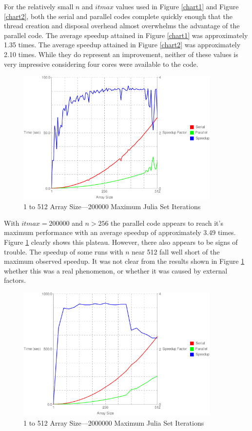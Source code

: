 \documentclass{article}
\begin{document}
For the relatively small \(n\) and \(itmax\) values used in Figure \ref{chart1} and Figure \ref{chart2}, both the serial and parallel codes complete quickly enough that the thread creation and disposal overhead almost overwhelms the advantage of the parallel code. The average speedup attained in Figure \ref{chart1} was approximately 1.35 times. The average speedup attained in Figure \ref{chart2} was approximately 2.10 times. While they do represent an improvement, neither of these values is very impressive considering four cores were available to the code.

\begin{figure}
\centering
\includegraphics[width=0.9\textwidth]{chart3nt.png}
\caption{1 to 512 Array Size---200000 Maximum Julia Set Iterations}
\label{chart3}
\end{figure}

With \(itmax = 200000\) and \(n > 256\) the parallel code appears to reach it's maximum performance with an average speedup of approximately 3.49 times. Figure \ref{chart3} clearly shows this plateau. However, there also appears to be signs of trouble. The speedup of some runs with \(n\) near 512 fall well short of the maximum observed speedup. It was not clear from the results shown in Figure \ref{chart3} whether this was a real phenomenon, or whether it was caused by external factors.

\begin{figure}
\centering
\includegraphics[width=0.9\textwidth]{chart4nt.png}
\caption{1 to 512 Array Size---2000000 Maximum Julia Set Iterations}
\label{chart4}
\end{figure}
\end{document}
